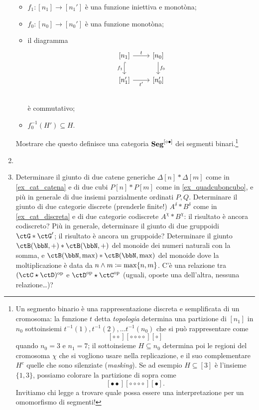 \begin{enumerate}
	\begin{itemize}
		\item $f_1 : [n_1] \to [n_1']$ è una funzione iniettiva e monotòna;
		\item $f_0 : [n_0] \to [n_0']$ è una funzione monotòna;
		\item il diagramma 
		\[\begin{tikzcd}
			{[n_1]}\ar[r, "t"]\ar[d, hook, "{f_1}"'] & {[n_0]} \ar[d, "f_0"]\\ 
			{[n_1']} \ar[r, "{t'}"'] & {[n_0']} \\ 
		\end{tikzcd}\]
		è commutativo;
		\item $f_0^{-1}(H')\subseteq H$.
	\end{itemize}
	Mostrare che questo definisce una categoria $\mathbf{Seg}^{[{\circ}{\bullet}]}$ dei segmenti binari.\footnote{Un segmento binario è una rappresentazione discreta e semplificata di un cromosoma: la funzione $t$ detta \emph{topologia} determina una partizione di $[n_1]$ in $n_0$ sottoinsiemi $t^{-1}(1),t^{-1}(2),\dots t^{-1}(n_0)$ che si può rappresentare come 
	\[[{\circ}{\circ}][{\circ}{\circ}{\circ}{\circ}][{\circ}]\]
	quando $n_0=3$ e $n_1=7$; il sottoinsieme $H\subseteq n_0$ determina poi le regioni del cromosoma $\chi$ che si vogliono usare nella replicazione, e il suo complementare $H^c$ quelle che sono silenziate (\emph{masking}). Se ad esempio $H\subseteq [3]$ è l'insieme $\{1,3\}$, possiamo colorare la partizione di sopra come 
	\[[{\bullet}{\bullet}][{\circ}{\circ}{\circ}{\circ}][{\bullet}].\]
	Invitiamo chi legge a trovare quale possa essere una interpretazione per un omomorfismo di segmenti!}
	\item\Todo{}
	\item Determinare il giunto di due catene generiche \(\Delta[n] * \Delta[m]\) come in \ref{ex_cat_catena} e di due cubi \(P[n] * P[m]\) come in \ref{ex_quadcuboncubo}, e più in generale di due insiemi parzialmente ordinati \(P,Q\). Determinare il giunto di due categorie discrete (prenderle finite!) \(A^\delta * B^\delta\) come in \ref{ex_cat_discreta} e di due categorie codiscrete \(A^\chi * B^\chi\): il risultato è ancora codiscreto? Più in generale, determinare il giunto di due gruppoidi \(\ctG * \ctG'\); il risultato è ancora un gruppoide? Determinare il giunto \(\ctB(\bbN,+) * \ctB(\bbN,+)\) del monoide dei numeri naturali con la somma, e \(\ctB(\bbN,\max) * \ctB(\bbN,\max)\) del monoide dove la moltiplicazione è data da \(n\land m \coloneqq \max\{n,m\}\). C'è una relazione tra \((\ctC\star\ctD)^\op\) e \(\ctD^\op\star\ctC^\op\) (uguali, oposte una dell'altra, nessuna relazione\dots)?
\end{enumerate}
